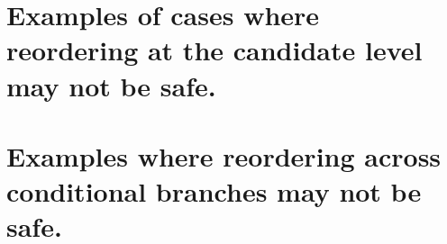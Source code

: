 
\section{Examples of cases where reordering at the candidate level may not be safe.}

    

\section{Examples where reordering across conditional branches may not be safe.}

    